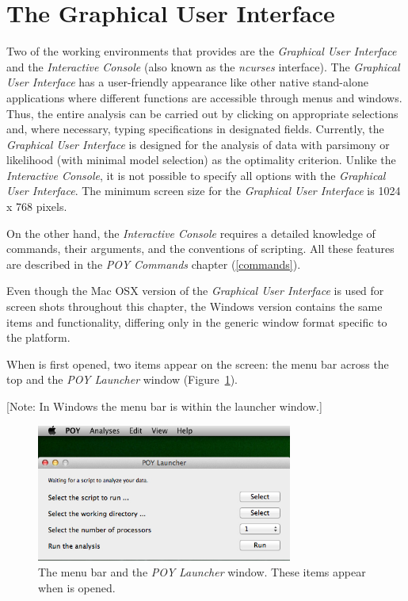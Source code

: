 
\section{The Graphical User Interface}

Two of the working environments that \poy provides are the
\emph{Graphical User Interface} and the \emph{Interactive Console}
(also known as the \emph{ncurses} interface). The \emph{Graphical
User Interface} has a user-friendly appearance like other native
stand-alone applications where different functions are accessible
through menus and windows. Thus, the entire analysis can be carried
out by clicking on appropriate selections and, where necessary,
typing specifications in designated fields. Currently, the
\emph{Graphical User Interface} is designed for the analysis of
data with parsimony or likelihood (with minimal model selection)
as the optimality criterion.  Unlike the \emph{Interactive Console},
it is not possible to specify all options with the \emph{Graphical
User Interface}.  The minimum screen size for the \emph{Graphical
User Interface} is 1024 x 768 pixels.

On the other hand, the \emph{Interactive Console} requires a detailed
knowledge of \poy commands, their arguments, and the conventions
of \poy scripting. All these features are described in the \emph{POY
Commands} chapter (\ref{commands}).

Even though the Mac OSX version of the \emph{Graphical User Interface}
is used for screen shots throughout this chapter, the Windows version
contains the same items and functionality, differing only in the
generic window format specific to the platform.

When \poy is first opened, two items appear on the screen: the \poy
menu bar across the top and the \emph{POY Launcher} window
(Figure~\ref{fig:menu_launcher_window}).

[Note: In Windows the menu bar is within the launcher window.]

\begin{figure}[htpb]
\begin{center}
\includegraphics[width=0.75\textwidth]{doc/figures/menu_launcher_window.jpg}
\end{center}
\caption{The \poy menu bar and the \emph{POY Launcher} window. 
These items appear when \poy is opened.}
\label{fig:menu_launcher_window}
\end{figure}

